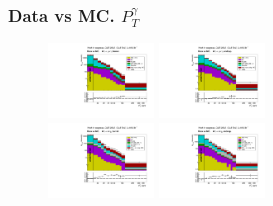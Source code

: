 \begin{frame}\frametitle{Data vs MC. $P_T^{\gamma}$}
\scriptsize
  \begin{figure}[htb]
    \begin{center}
       \includegraphics[width=0.25\textwidth]{../figs/figs_v11/MUON_WGamma/PrepareYields/c_TotalDATAvsMC_Barrel__phoEt.pdf} \includegraphics[width=0.25\textwidth]{../figs/figs_v11/MUON_WGamma/PrepareYields/c_TotalDATAvsMC_Endcap__phoEt.pdf}\\
       \includegraphics[width=0.25\textwidth]{../figs/figs_v11/ELECTRON_WGamma/PrepareYields/c_TotalDATAvsMC_Barrel__phoEt.pdf} \includegraphics[width=0.25\textwidth]{../figs/figs_v11/ELECTRON_WGamma/PrepareYields/c_TotalDATAvsMC_Endcap__phoEt.pdf}\\
    \end{center}
  \end{figure}
\end{frame}
